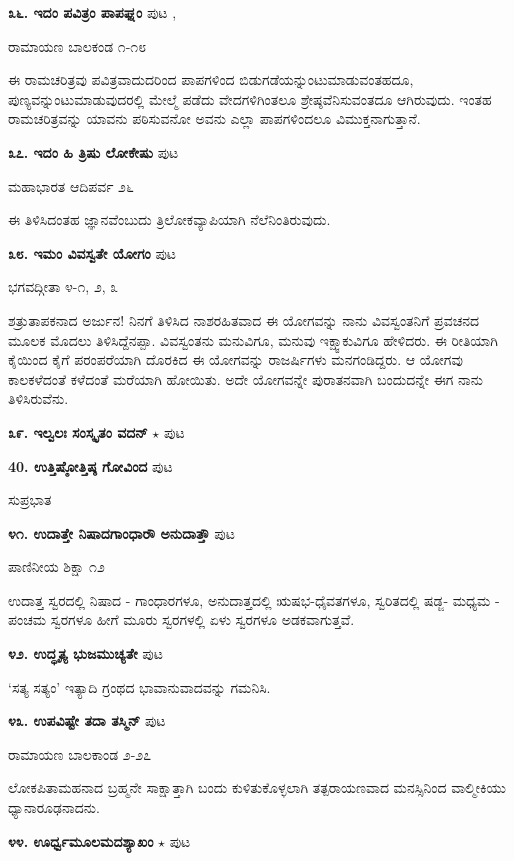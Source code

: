 \medskip
\noindent\textbf{೩೬. ಇದಂ ಪವಿತ್ರಂ ಪಾಪಘ್ನಂ} \hfill ಪುಟ \pageref{181},\pageref{211h}

\hfill ರಾಮಾಯಣ ಬಾಲಕಂಡ ೧-೧೮

ಈ ರಾಮಚರಿತ್ರವು ಪವಿತ್ರವಾದುದರಿಂದ ಪಾಪಗಳಿಂದ ಬಿಡುಗಡೆಯನ್ನುಂಟುಮಾಡುವಂತಹದೂ, ಪುಣ್ಯವನ್ನುಂಟುಮಾಡುವುದರಲ್ಲಿ ಮೇಲ್ಮೆ  ಪಡೆದು ವೇದಗಳಿಗಿಂತಲೂ ಶ್ರೇಷ್ಠವೆನಿಸುವಂತದೂ ಆಗಿರುವುದು. ಇಂತಹ ರಾಮಚರಿತ್ರವನ್ನು ಯಾವನು ಪಠಿಸುವನೋ ಅವನು ಎಲ್ಲಾ ಪಾಪಗಳಿಂದಲೂ ವಿಮುಕ್ತನಾಗುತ್ತಾನೆ. 

\medskip
\noindent\textbf{೩೭. ಇದಂ ಹಿ ತ್ರಿಷು ಲೋಕೇಷು} \hfill ಪುಟ \pageref{118a}

\hfill ಮಹಾಭಾರತ ಆದಿಪರ್ವ ೨೬

ಈ ತಿಳಿಸಿದಂತಹ ಜ್ಞಾನವೆಂಬುದು ತ್ರಿಲೋಕವ್ಯಾಪಿಯಾಗಿ ನೆಲೆನಿಂತಿರುವುದು. 

\medskip
\noindent\textbf{೩೮. ಇಮಂ ವಿವಸ್ವತೇ ಯೋಗಂ} \hfill ಪುಟ \pageref{90}

\hfill ಭಗವದ್ಗೀತಾ ೪-೧, ೨, ೩

ಶತ್ರುತಾಪಕನಾದ ಅರ್ಜುನ! ನಿನಗೆ ತಿಳಿಸಿದ ನಾಶರಹಿತವಾದ ಈ ಯೋಗವನ್ನು ನಾನು ವಿವಸ್ವಂತನಿಗೆ ಪ್ರವಚನದ ಮೂಲಕ ಮೊದಲು ತಿಳಿಸಿದ್ದೆನಪ್ಪಾ. ವಿವಸ್ವಂತನು ಮನುವಿಗೂ, ಮನುವು ಇಕ್ಷ್ವಾಕುವಿಗೂ ಹೇಳಿದರು. ಈ ರೀತಿಯಾಗಿ ಕೈಯಿಂದ ಕೈಗೆ ಪರಂಪರೆಯಾಗಿ ದೊರಕಿದ ಈ ಯೋಗವನ್ನು ರಾಜರ್ಷಿಗಳು ಮನಗಂಡಿದ್ದರು. ಆ ಯೋಗವು ಕಾಲಕಳೆದಂತೆ ಕಳೆದಂತೆ ಮರೆಯಾಗಿ ಹೋಯಿತು. ಅದೇ ಯೋಗವನ್ನೇ ಪುರಾತನವಾಗಿ ಬಂದುದನ್ನೇ ಈಗ ನಾನು ತಿಳಿಸಿರುವೆನು.

\medskip
\noindent\textbf{೩೯. ಇಲ್ವಲಃ ಸಂಸ್ಕೃತಂ ವದನ್} $\star$ \hfill ಪುಟ \pageref{232a}

\medskip
\noindent\textbf{40. ಉತ್ತಿಷ್ಠೋತ್ತಿಷ್ಠ ಗೋವಿಂದ} \hfill ಪುಟ \pageref{147}

\hfill ಸುಪ್ರಭಾತ

\medskip
\noindent\textbf{೪೧. ಉದಾತ್ತೇ ನಿಷಾದಗಾಂಧಾರೌ ಅನುದಾತ್ತೌ} \hfill ಪುಟ \pageref{13}

\hfill ಪಾಣಿನೀಯ ಶಿಕ್ಷಾ ೧೨

ಉದಾತ್ತ ಸ್ವರದಲ್ಲಿ ನಿಷಾದ - ಗಾಂಧಾರಗಳೂ, ಅನುದಾತ್ತದಲ್ಲಿ ಋಷಭ-ಧೈವತಗಳೂ, ಸ್ವರಿತದಲ್ಲಿ ಷಡ್ಜ- ಮಧ್ಯಮ - ಪಂಚಮ ಸ್ವರಗಳೂ ಹೀಗೆ ಮೂರು ಸ್ವರಗಳಲ್ಲಿ ಏಳು ಸ್ವರಗಳೂ ಅಡಕವಾಗುತ್ತವೆ.

\medskip
\noindent\textbf{೪೨. ಉದ್ಧೃತ್ಯ ಭುಜಮುಚ್ಯತೇ} \hfill ಪುಟ \pageref{130}

`ಸತ್ಯ ಸತ್ಯಂ' ಇತ್ಯಾದಿ ಗ್ರಂಥದ ಭಾವಾನುವಾದವನ್ನು ಗಮನಿಸಿ.

\medskip
\noindent\textbf{೪೩. ಉಪವಿಷ್ಟೇ ತದಾ ತಸ್ಮಿನ್} \hfill ಪುಟ \pageref{203}

\hfill ರಾಮಾಯಣ ಬಾಲಕಾಂಡ ೨-೨೭

ಲೋಕಪಿತಾಮಹನಾದ ಬ್ರಹ್ಮನೇ ಸಾಕ್ಷಾತ್ತಾಗಿ ಬಂದು ಕುಳಿತುಕೊಳ್ಳಲಾಗಿ ತತ್ಪರಾಯಣವಾದ ಮನಸ್ಸಿನಿಂದ ವಾಲ್ಮೀಕಿಯು ಧ್ಯಾನಾರೂಢನಾದನು.

\medskip
\noindent\textbf{೪೪. ಊರ್ಧ್ವಮೂಲಮದಶ್ಯಾಖಂ} $\star$ \hfill ಪುಟ \pageref{13a}

